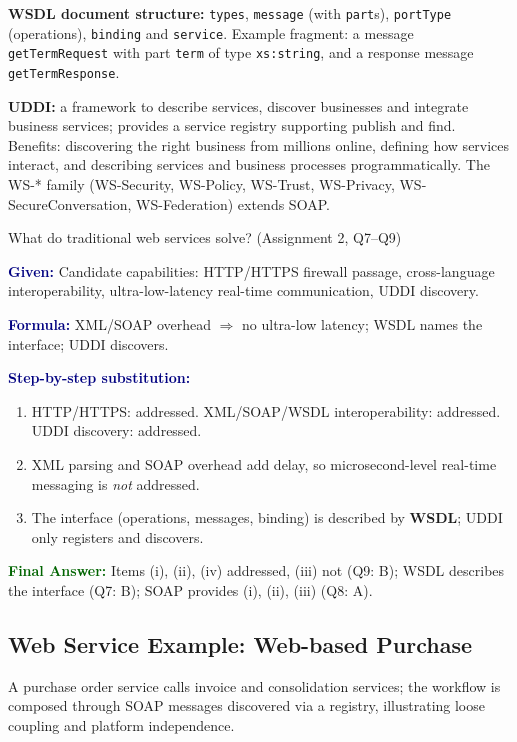 \documentclass[11pt,a4paper,openany]{report}
\newcommand{\Given}{\par\textbf{\textcolor{navy}{Given:}} }
\newcommand{\Formula}{\par\textbf{\textcolor{navy}{Formula:}} }
\newcommand{\Steps}{\par\textbf{\textcolor{navy}{Step-by-step substitution:}}\par}
\newcommand{\Answer}{\par\textbf{\textcolor{darkgreen}{Final Answer:}} }
\begin{document}
\textbf{WSDL document structure:} \texttt{types}, \texttt{message} (with \texttt{part}s), \texttt{portType} (operations),
\texttt{binding} and \texttt{service}. Example fragment: a message \texttt{getTermRequest} with part \texttt{term} of
type \texttt{xs:string}, and a response message \texttt{getTermResponse}.

\textbf{UDDI:} a framework to describe services, discover businesses and integrate business services; provides a service
registry supporting publish and find. Benefits: discovering the right business from millions online, defining how services
interact, and describing services and business processes programmatically.
The WS-* family (WS-Security, WS-Policy, WS-Trust, WS-Privacy, WS-SecureConversation, WS-Federation) extends SOAP.

\begin{solved}{What do traditional web services solve? (Assignment 2, Q7--Q9)}
\Given Candidate capabilities: HTTP/HTTPS firewall passage, cross-language interoperability, ultra-low-latency
real-time communication, UDDI discovery.
\Formula XML/SOAP overhead $\Rightarrow$ no ultra-low latency; WSDL names the interface; UDDI discovers.
\Steps
\begin{enumerate}[leftmargin=*]
  \item HTTP/HTTPS: addressed. XML/SOAP/WSDL interoperability: addressed. UDDI discovery: addressed.
  \item XML parsing and SOAP overhead add delay, so microsecond-level real-time messaging is \emph{not} addressed.
  \item The interface (operations, messages, binding) is described by \textbf{WSDL}; UDDI only registers and discovers.
\end{enumerate}
\Answer Items (i), (ii), (iv) addressed, (iii) not (Q9: B); WSDL describes the interface (Q7: B); SOAP provides (i), (ii),
(iii) (Q8: A).
\end{solved}

\subsection{Web Service Example: Web-based Purchase}
A purchase order service calls invoice and consolidation services; the workflow is composed through SOAP messages
discovered via a registry, illustrating loose coupling and platform independence.
\end{document}
